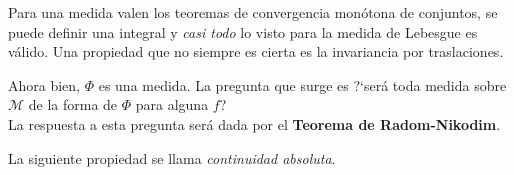                     
                    Para una medida valen los teoremas de convergencia mon\'otona de conjuntos, se puede definir una integral y \emph{casi todo} lo visto para la medida de Lebesgue es v\'alido. Una propiedad que no siempre es cierta es la invariancia por traslaciones.
                    
                    Ahora bien,  $\Phi$ es una medida. 
                    La pregunta que surge es ?`ser\'a toda medida sobre
                    $\mathcal{M}$ de la forma de $\Phi$ para alguna $f$?\\
                    La respuesta a esta pregunta ser\'a dada por el \textbf{Teorema de Radom-Nikodim}.
                    
                    
                    La siguiente propiedad se llama \emph{continuidad absoluta}.
                    
                    